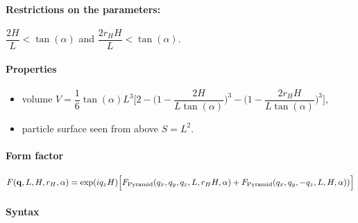 \paragraph{Restrictions on the parameters:} $\dfrac{2H}{L}< \tan(\alpha)$ and $\dfrac{2r_HH}{L}< \tan(\alpha)$.

\paragraph{Properties}
\begin{itemize}
\item volume $ V= \dfrac{1}{6} \tan(\alpha)L^3 \Big[ 2
         - \Big(1 - \dfrac{2H }{L\tan(\alpha)} \Big)^3
           - \Big(1 - \dfrac{2 r_H
             H}{L\tan(\alpha) }\Big)^3\Big]$,
\item particle surface seen from above $S =L^2$.
\end{itemize}

\paragraph{Form factor}
\begin{equation*}
F(\mathbf{q}, L, H, r_H, \alpha)=\exp(iq_z
H)\Big[F_{\rm{Pyramid}}(q_x,q_y, q_z, L, r_H H,
\alpha)+F_{\rm{Pyramid}}(q_x, q_y, -q_z, L, H, \alpha))\Big]
\end{equation*}

\paragraph{Syntax}\strut\\

